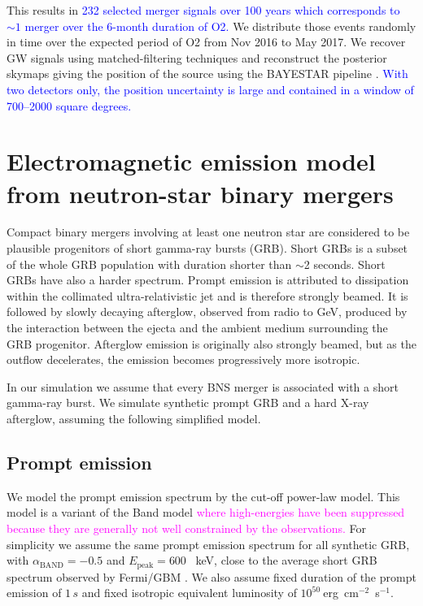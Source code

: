 \documentclass[11pt]{article}
\begin{document}
This results in \textcolor{blue}{232 selected merger signals over 100 years which corresponds to
$\sim 1$ merger over the 6-month duration of O2.} We distribute those events
randomly in time over the expected period of O2 from Nov 2016 to May 2017. We
recover GW signals using matched-filtering techniques and reconstruct the
posterior skymaps giving the position of the source using the BAYESTAR pipeline
\citep{2016PhRvD..93b4013S}.  \textcolor{blue}{With two detectors only, the position uncertainty is
large and contained in a window of 700--2000 square degrees.}

\section*{Electromagnetic emission model from neutron-star binary mergers}

Compact binary mergers involving at least one neutron star are considered to be
plausible progenitors of short gamma-ray bursts (GRB). Short GRBs is a
subset of the whole GRB population with duration shorter than $\sim$2
seconds. Short GRBs have also a harder spectrum. Prompt emission is attributed
to dissipation within the collimated ultra-relativistic jet and is therefore
strongly beamed. It is followed by slowly decaying afterglow, observed from
radio to GeV, produced by the interaction between the ejecta and the ambient
medium surrounding the GRB progenitor. Afterglow emission is originally also
strongly beamed, but as the outflow decelerates, the emission becomes
progressively more isotropic.

In our simulation we assume that every BNS merger is associated with a short
gamma-ray burst. We simulate synthetic prompt GRB and a hard X-ray afterglow,
assuming the following simplified model. \\

\subsection*{Prompt emission}

We model the prompt emission spectrum by the cut-off power-law model. This
model is a variant of the Band model \citep{1993ApJ...413..281B} \textcolor{magenta}{where high-energies have
been suppressed because they are generally not well constrained by the
observations.} For simplicity we assume the same prompt emission spectrum
for all synthetic GRB, with $\alpha_{\mathrm{BAND}} = - 0.5$ and
$E_{\mathrm{peak}} = 600$ \, keV, close to the average short GRB spectrum
observed by Fermi/GBM \citep{2014ApJS..211...12G}.   
We also assume
fixed duration of the prompt emission of $1 \, s$ and fixed isotropic equivalent
luminosity of $10^{50}~$erg~cm$^{-2}$~s$^{-1}$.
\end{document}
